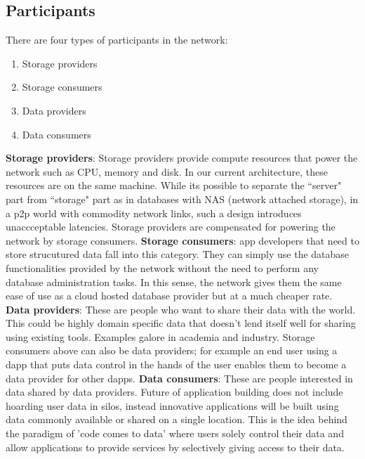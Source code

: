 \subsection{Participants}
There are four types of participants in the network:
\begin{enumerate}
	\item Storage providers
	\item Storage consumers
	\item Data providers
	\item Data consumers \newline
\end{enumerate}
\textbf{Storage providers}: Storage providers provide compute resources that power the network such as CPU, memory and disk. In our current architecture, these resources are on the same machine. While its possible to separate the ``server" part from ``storage" part as in databases with NAS (network attached storage), in a p2p world with commodity network links, such a design introduces unaccceptable latencies. Storage providers are compensated for powering the network by storage consumers. 
\newline\newline
\textbf{Storage consumers}: \DJ app developers that need to store strucutured data fall into this category. They can simply use the database functionalities provided by the network without the need to perform any database administration tasks. In this sense, the network gives them the same ease of use as a cloud hosted database provider but at a much cheaper rate.
\newline\newline
\textbf{Data providers}: These are people who want to share their data with the world. This could be highly domain specific data that doesn't lend itself well for sharing using existing tools. Examples galore in academia and industry. Storage consumers above can also be data providers; for example an end user using a dapp that puts data control in the hands of the user enables them to become a data provider for other dapps.
\newline\newline
\textbf{Data consumers}: These are people interested in data shared by data providers. Future of application building does not include hoarding user data in silos, instead innovative applications will be built using data commonly available or shared on a single location. This is the idea behind the paradigm of 'code comes to data' where users solely control their data and allow applications to provide services by selectively giving access to their data.


